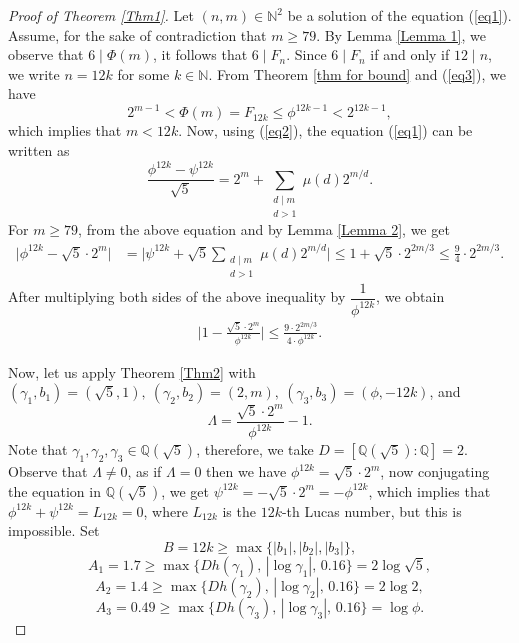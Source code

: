 \documentclass[10pt,a4paper]{amsart}
\begin{document}
\begin{proof}[Proof of Theorem \ref{Thm1}]
Let $(n,m)\in \mathbb{N}^2$ be a solution of the equation (\ref{eq1}).
Assume, for the sake of contradiction that $m\geq79$. By Lemma \ref{Lemma 1}, we observe that $6\mid \Phi(m)$, it follows that $6\mid F_n$. Since $6\mid F_n$ if and only if $12\mid n$, we write $n=12k$ for some $k\in \mathbb{N}$.
From Theorem \ref{thm for bound} and (\ref{eq3}), we have 
$$2^{m-1}<\Phi(m)=F_{12k}\leq \phi^{12k-1}<2^{12k-1},$$ 
which implies that $m<12k$. Now, using (\ref{eq2}), the equation (\ref{eq1}) can be written as
$$\frac{\phi^{12k}-\psi^{12k}}{\sqrt{5}}=2^m+\sum_{\substack{d \mid m\\d>1}} \mu(d) 2^{m/d}.$$
For $m\geq79$, from the above equation and by Lemma \ref{Lemma 2}, we get
\begin{align*}
\bigg|\phi^{12k}-\sqrt{5}\cdot2^m\bigg|&=\bigg|\psi^{12k}+\sqrt{5}\sum_{\substack{d \mid m\\d>1}} \mu(d) 2^{m/d}\bigg|\leq 1+\sqrt{5}\cdot 2^{2m/3}\leq \frac{9}{4}\cdot 2^{2m/3}.
\end{align*}
After multiplying both sides of the above inequality by $\dfrac{1}{\phi^{12k}}$, we obtain
\begin{align*}\label{eq4}
    \bigg|1-\frac{\sqrt{5}\cdot 2^m}{\phi^{12k}}\bigg|\leq \frac{9\cdot 2^{2m/3}}{4\cdot\phi^{12k}}.\tag{4}
\end{align*}

Now, let us apply Theorem \ref{Thm2} with $(\gamma _{1},b_1)=(\sqrt{5},1),~(\gamma _{2},b_2)=(2 ,m),~(\gamma_{3},b_3)=(\phi,-12k)$, and 
$$\Lambda = \frac{\sqrt{5}\cdot 2^m}{\phi^{12k}} - 1.$$
Note that $\gamma_1,\gamma_2,\gamma_3\in \mathbb{Q}(\sqrt{5})$, therefore, we take $D=[\mathbb{Q}(\sqrt5):\mathbb{Q}]=2$.
Observe that $\Lambda\neq0$, as if $\Lambda=0$ then we have $\phi^{12k}=\sqrt{5}\cdot 2^m$, now conjugating the equation in $\mathbb{Q}(\sqrt{5})$, we get $\psi^{12k}=-\sqrt{5}\cdot 2^m=-\phi^{12k}$, which implies that $\phi^{12k}+\psi^{12k}=L_{12k}=0$, where $L_{12k}$ is the $12k$-th Lucas number, but this is impossible. Set
$$B=12k\geq\max\{|b_1|,|b_2|,|b_3|\},$$
$$ A_1=1.7\geq \max\{D h(\gamma_1),\,|\log \gamma_1|,\,0.16\}=2\log\sqrt{5},$$
$$A_2=1.4\geq \max\{D h(\gamma_2),\,|\log \gamma_2|,\,0.16\}=2\log2,$$
$$A_3=0.49\geq \max\{D h(\gamma_3),\,|\log \gamma_3|,\,0.16\}=\log \phi.$$


\end{proof}
\end{document}
